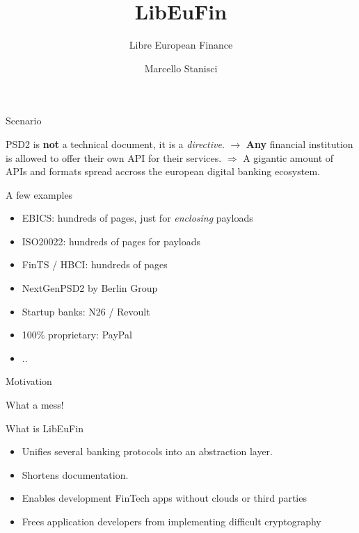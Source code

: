 \documentclass[pdf]{beamer}
\title{LibEuFin}
\subtitle{Libre European Finance}
\author{Marcello Stanisci}
\begin{document}

\begin{frame}
  \titlepage
\end{frame}

\begin{frame}{Scenario}

  \begin{center}
  PSD2 is \textbf{not} a technical document, \iffalse (EXPLAIN) \fi
  it is a {\it directive}. \iffalse (EXPLAIN) \fi \newline
  $\rightarrow$ \textbf{Any} financial institution is allowed to offer their
  own API for their services. \newline
  $\Rightarrow$ A gigantic amount of APIs and formats spread accross the
  european digital banking ecosystem.
  \end{center}
\end{frame}

\begin{frame}{A few examples}
  \begin{itemize}
    \item EBICS: hundreds of pages, just for {\it enclosing} payloads
    \item ISO20022: hundreds of pages for payloads
    \item FinTS / HBCI: hundreds of pages
    \item NextGenPSD2 by Berlin Group 
    \item Startup banks: N26 / Revoult
    \item 100\% proprietary: PayPal
    \item ..
  \end{itemize}
\end{frame}

\begin{frame}{Motivation}
  \begin{center}
  What a mess!
  \end{center}
\end{frame}

\begin{frame}{What is LibEuFin}
  \begin{itemize}
  \item Unifies several banking protocols into an abstraction layer.
  \item Shortens documentation.
  \item Enables development FinTech apps without clouds or third parties
  \item Frees application developers from implementing difficult cryptography
  \end{itemize}
\end{frame}
\end{document}
